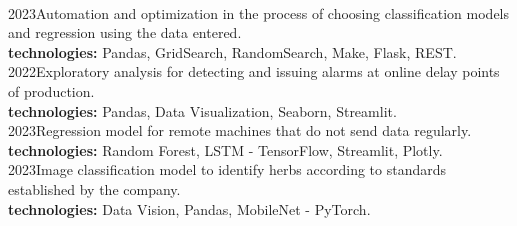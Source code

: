 \documentclass[
    10pt,
    english,
]{article}
\begin{document}
\\
{}{2023}{Automation and optimization in the process of choosing classification models and regression using the data entered. \\ \textbf{technologies:} Pandas, GridSearch, RandomSearch, Make, Flask, REST.}
\\
{}{2022}{Exploratory analysis for detecting and issuing alarms at online delay points of production. \\ \textbf{technologies:} Pandas, Data Visualization, Seaborn, Streamlit.}
\\
{}{2023}{Regression model for remote machines that do not send data regularly. \\ \textbf{technologies:} Random Forest, LSTM - TensorFlow, Streamlit, Plotly.}
\\
{}{2023}{Image classification model to identify herbs according to standards established by the company. \\ \textbf{technologies:} Data Vision, Pandas, MobileNet - PyTorch.}

\newpage
\end{document}
